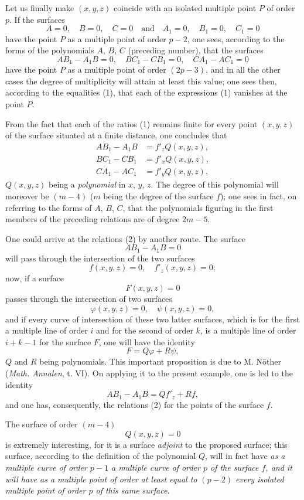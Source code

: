 \documentclass{article}
\begin{document}
Let us finally make $(x, y, z)$ coincide with an isolated multiple point $P$ of order $p$. If the surfaces
\[
A = 0, \quad B = 0, \quad C = 0 \quad \text{and} \quad A_{1} = 0, \quad B_{1} = 0, \quad C_{1} = 0
\]
have the point $P$ as a multiple point of order $p - 2$, one sees, according to the forms of the polynomials $A$, $B$, $C$ (preceding number), that the surfaces
\[
AB_{1} - A_{1}B = 0, \quad BC_{1} - CB_{1} = 0, \quad CA_{1} - AC_{1} = 0
\]
have the point $P$ as a multiple point of order $(2p - 3)$, and in all the other cases the degree of multiplicity will attain at least this value; one sees then, according to the equalities (1), that each of the expressions (1) vanishes at the point $P$.

From the fact that each of the ratios (1) remains finite for every point $(x, y, z)$ of the surface situated at a finite distance, one concludes that
\[
\begin{aligned}
AB_{1} - A_{1}B &= f'_{z} Q(x, y, z), \\
BC_{1} - CB_{1} &= f'_{x} Q(x, y, z), \\
CA_{1} - AC_{1} &= f'_{y} Q(x, y, z),
\end{aligned}
\tag{2}
\]
$Q(x, y, z)$ being a \emph{polynomial} in $x$, $y$, $z$. The degree of this polynomial will moreover be $(m - 4)$ ($m$ being the degree of the surface $f$); one sees in fact, on referring to the forms of $A$, $B$, $C$, that the polynomials figuring
in the first members of the preceding relations are of degree $2m - 5$.

One could arrive at the relations (2) by another route. The surface
\[
AB_{1} - A_{1}B = 0
\]
will pass through the intersection of the two surfaces
\[
f(x, y, z) = 0, \quad f'_{z}(x, y, z) = 0;
\]
now, if a surface
\[
F(x, y, z) = 0
\]
passes through the intersection of two surfaces
\[
\varphi(x, y, z) = 0, \quad \psi(x, y, z) = 0,
\]
and if every curve of intersection of these two latter surfaces, which is for the first a multiple line of order $i$ and for the second of order $k$, is a multiple line of order $i + k - 1$ for the surface $F$, one will have the identity
\[
F = Q\varphi + R\psi,
\]
$Q$ and $R$ being polynomials. This important proposition is due to M. Nöther (\emph{Math. Annalen}, t. VI). On applying it to the present example, one is led to the identity
\[
AB_{1} - A_{1}B = Qf'_{z} + Rf,
\]
and one has, consequently, the relations (2) for the points of the surface $f$.

The surface of order $(m - 4)$
\[
Q(x, y, z) = 0
\]
is extremely interesting, for it is a surface \emph{adjoint} to the proposed surface; this surface, according to the definition of the polynomial $Q$, will in fact have \emph{as a multiple curve of order $p - 1$ a multiple curve of order $p$ of the surface $f$, and it will have as a multiple point of order at least equal to $(p - 2)$ every isolated multiple point of order $p$ of this same surface.}
\end{document}
